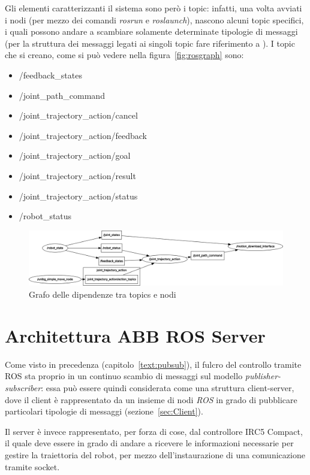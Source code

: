 Gli elementi caratterizzanti il sistema sono però i topic: infatti, una volta avviati i nodi (per mezzo dei comandi \emph{rosrun} e \emph{roslaunch}), nascono alcuni topic specifici, i quali possono andare a scambiare solamente determinate tipologie di messaggi (per la struttura dei messaggi legati ai singoli topic fare riferimento a \cite{online:ROS-api}). I topic che si creano, come si può vedere nella figura~\vref{fig:rosgraph} sono:
\begin{itemize}
	\item /feedback\_states
	\item /joint\_path\_command
	\item /joint\_trajectory\_action/cancel
	\item /joint\_trajectory\_action/feedback
	\item /joint\_trajectory\_action/goal
	\item /joint\_trajectory\_action/result
	\item /joint\_trajectory\_action/status
	\item  /robot\_status
\end{itemize}
\begin{figure}
	\centering
	\includegraphics[width=1.3\textwidth]{Immagini/rosgraph}
	\caption{Grafo delle dipendenze tra topics e nodi}
	\label{fig:rosgraph}
\end{figure}
\section{Architettura ABB ROS Server}
Come visto in precedenza (capitolo~\vref{text:pubsub}), il fulcro del controllo tramite ROS sta proprio in un continuo scambio di messaggi sul modello \emph{publisher-subscriber}: essa può essere quindi considerata come una struttura client-server, dove il client è rappresentato da un insieme di nodi \emph{ROS} in grado di pubblicare particolari tipologie di messaggi (sezione~\vref{sec:Client}). 

Il server è invece rappresentato, per forza di cose, dal controllore IRC5 Compact, il quale deve essere in grado di andare a ricevere le informazioni necessarie per gestire la traiettoria del robot, per mezzo dell'instaurazione di una comunicazione tramite socket.

